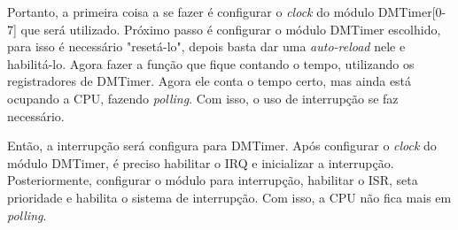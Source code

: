 \documentclass[12pt]{article}
\begin{document}
		Portanto, a primeira coisa a se fazer é configurar o \textit{clock} do módulo DMTimer[0-7] que será utilizado. Próximo passo é configurar o módulo DMTimer escolhido, para isso é necessário "resetá-lo", depois basta dar uma \textit{auto-reload} nele e habilitá-lo. Agora fazer a função que fique contando o tempo, utilizando os registradores de DMTimer. Agora ele conta o tempo certo, mas ainda está ocupando a CPU, fazendo \textit{polling}. Com isso, o uso de interrupção se faz necessário. \
		
		Então, a interrupção será configura para DMTimer. Após configurar o \textit{clock} do módulo DMTimer, é preciso habilitar o IRQ e inicializar a interrupção. Posteriormente, configurar o módulo para interrupção, habilitar o ISR, seta prioridade e habilita o sistema de interrupção. Com isso, a CPU não fica mais em \textit{polling}.
\end{document}
